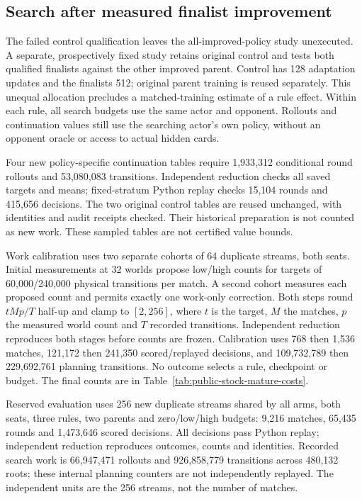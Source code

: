 \FloatBarrier
\subsection{Search after measured finalist improvement}
\label{app:public-stock-mature-variants}
The failed control qualification leaves the all-improved-policy study
unexecuted. A separate, prospectively fixed study retains original control
and tests both qualified finalists against the other improved parent.
Control has 128 adaptation updates and the finalists 512; original parent
training is reused separately. This unequal allocation precludes a
matched-training estimate of a rule effect. Within each rule, all search
budgets use the same actor and opponent. Rollouts and continuation values
still use the searching actor's own policy, without an opponent oracle or
access to actual hidden cards.

Four new policy-specific continuation tables require 1,933,312 conditional
round rollouts and 53,080,083 transitions. Independent reduction checks all
saved targets and means; fixed-stratum Python replay checks 15,104 rounds
and 415,656 decisions. The two original control tables are reused unchanged,
with identities and audit receipts checked. Their historical preparation is
not counted as new work. These sampled tables are not certified value bounds.

Work calibration uses two separate cohorts of 64 duplicate streams, both
seats. Initial measurements at 32 worlds propose low/high counts for targets
of 60,000/240,000 physical transitions per match. A second cohort measures
each proposed count and permits exactly one work-only correction. Both steps
round $tMp/T$ half-up and clamp to $[2,256]$, where $t$ is the target,
$M$ the matches, $p$ the measured world count and $T$ recorded transitions.
Independent reduction reproduces both stages before counts are frozen.
Calibration uses 768 then 1,536 matches, 121,172 then 241,350 scored/replayed
decisions, and 109,732,789 then 229,692,761 planning transitions. No outcome
selects a rule, checkpoint or budget. The final counts are in
Table~\ref{tab:public-stock-mature-costs}.

Reserved evaluation uses 256 new duplicate streams shared by all arms,
both seats, three rules, two parents and zero/low/high budgets: 9,216 matches,
65,435 rounds and 1,473,646 scored decisions. All decisions pass Python
replay; independent reduction reproduces outcomes, counts and identities.
Recorded search work is 66,947,471 rollouts and 926,858,779 transitions across
480,132 roots; these internal planning counters are not independently replayed.
The independent units are the 256 streams, not the number of matches.

